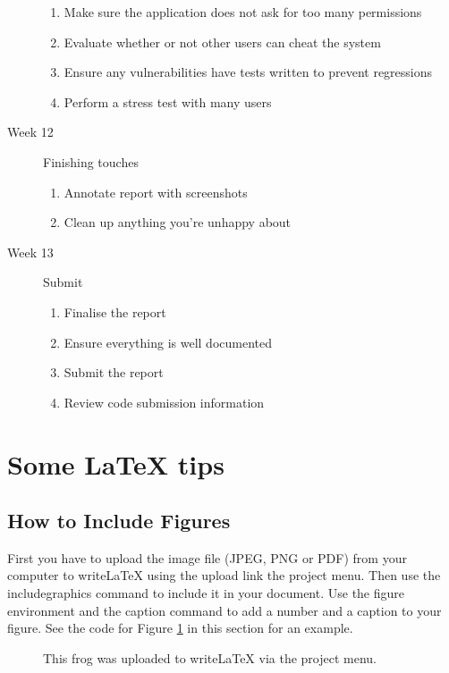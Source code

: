\documentclass[a4paper]{article}
\begin{document}
\begin{description}
\begin{enumerate}
            \item Make sure the application does not ask for too many permissions
            \item Evaluate whether or not other users can cheat the system
            \item Ensure any vulnerabilities have tests written to prevent regressions
            \item Perform a stress test with many users
        \end{enumerate}
    \item[Week 12] Finishing touches
        \begin{enumerate}
            \item Annotate report with screenshots
            \item Clean up anything you're unhappy about
        \end{enumerate}
    \item[Week 13] Submit
        \begin{enumerate}
            \item Finalise the report
            \item Ensure everything is well documented
            \item Submit the report
            \item Review code submission information
        \end{enumerate}
\end{description}
\pagebreak

\section{Some LaTeX tips}
\label{sec:latex}
\subsection{How to Include Figures}

First you have to upload the image file (JPEG, PNG or PDF) from your computer to writeLaTeX using the upload link the project menu. Then use the includegraphics command to include it in your document. Use the figure environment and the caption command to add a number and a caption to your figure. See the code for Figure \ref{fig:frog} in this section for an example.

\begin{figure}
    \centering
    \caption{\label{fig:frog}This frog was uploaded to writeLaTeX via the project menu.}
\end{figure}
\end{document}
